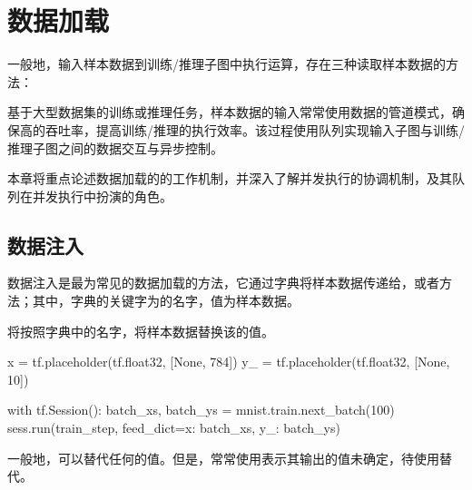 \begin{savequote}[45mm]
\end{savequote}

\chapter{数据加载} 
\label{ch:input-pipeline}

\begin{content}

一般地，输入样本数据到训练/推理子图中执行运算，存在三种读取样本数据的方法：

\begin{enum}
\end{enum}

基于大型数据集的训练或推理任务，样本数据的输入常常使用数据的管道模式，确保高的吞吐率，提高训练/推理的执行效率。该过程使用队列实现输入子图与训练/推理子图之间的数据交互与异步控制。

本章将重点论述数据加载的的工作机制，并深入了解并发执行的协调机制，及其队列在并发执行中扮演的角色。

\end{content}

\section{数据注入}

\begin{content}

数据注入是最为常见的数据加载的方法，它通过字典将样本数据传递给，或者方法；其中，字典的关键字为的名字，值为样本数据。

将按照字典中的名字，将样本数据替换该的值。

\begin{leftbar}
\begin{python}
x = tf.placeholder(tf.float32, [None, 784])
y_ = tf.placeholder(tf.float32, [None, 10])

with tf.Session():
  batch_xs, batch_ys = mnist.train.next_batch(100)
  sess.run(train_step, feed_dict={x: batch_xs, y_: batch_ys})
\end{python}
\end{leftbar}

一般地，可以替代任何的值。但是，常常使用表示其输出的值未确定，待使用替代。

\end{content}

